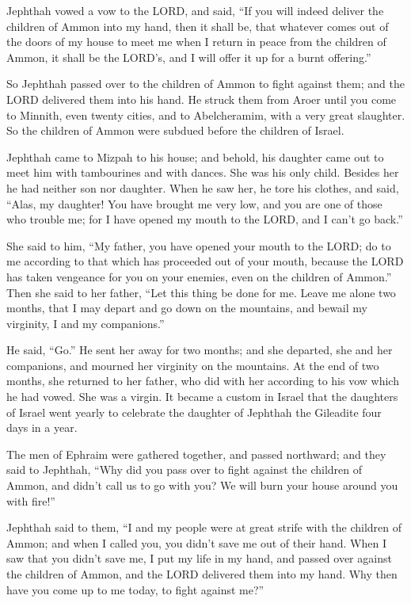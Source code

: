 \myverse{}Jephthah vowed a vow to the LORD, and said, “If you will indeed
deliver the children of Ammon into my hand,
\myverse{}then it shall be, that whatever comes out of the doors of my house to meet
me when I return in peace from the children of Ammon, it shall be the LORD’s, and I will offer it up for
a burnt offering.”

\myverse{}So Jephthah passed over to the children of Ammon to fight against
them; and the LORD delivered them into his hand.
\myverse{}He struck them from Aroer until you come to Minnith, even twenty cities,
and to Abelcheramim, with a very great slaughter. So the children of Ammon were subdued before the children
of Israel.

\myverse{}Jephthah came to Mizpah to his house; and behold, his daughter
came out to meet him with tambourines and with dances. She was his only child. Besides her he had neither
son nor daughter.
\myverse{}When he saw her, he tore his clothes, and said, “Alas, my daughter! You have
brought me very low, and you are one of those who trouble me; for I have opened my mouth to the LORD,
and I can’t go back.”

\myverse{}She said to him, “My father, you have opened your mouth to the
LORD; do to me according to that which has proceeded out of your mouth, because the LORD has taken vengeance
for you on your enemies, even on the children of Ammon.”
\myverse{}Then she said to her father, “Let this thing be done for me. Leave me alone
two months, that I may depart and go down on the mountains, and bewail my virginity, I and my companions.”

\myverse{}He said, “Go.” He sent her away for two months; and she departed,
she and her companions, and mourned her virginity on the mountains.
\myverse{}At the end of two months, she returned to her father, who did with her according
to his vow which he had vowed. She was a virgin. It became a custom in Israel
\myverse{}that the daughters of Israel went yearly to celebrate the daughter of Jephthah
the Gileadite four days in a year.


\mychapter{} \myverse*{}The men of Ephraim were gathered together, and passed northward;
and they said to Jephthah, “Why did you pass over to fight against the children of Ammon, and didn’t call
us to go with you? We will burn your house around you with fire!”

\myverse{}Jephthah said to them, “I and my people were at great strife with
the children of Ammon; and when I called you, you didn’t save me out of their hand.
\myverse{}When I saw that you didn’t save me, I put my life in my hand, and passed over
against the children of Ammon, and the LORD delivered them into my hand. Why then have you come up to
me today, to fight against me?”

